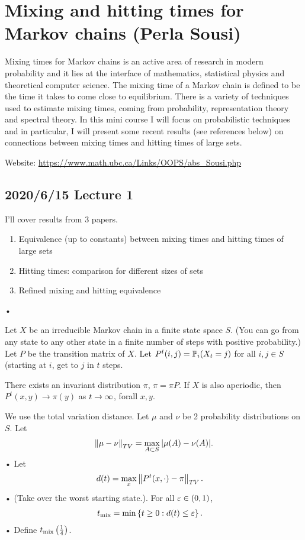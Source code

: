 \section{Mixing and hitting times for Markov chains (Perla Sousi)}

Mixing times for Markov chains is an active area of research in modern probability and it lies at the interface of mathematics, statistical physics and theoretical computer science. The mixing time of a Markov chain is defined to be the time it takes to come close to equilibrium. There is a variety of techniques used to estimate mixing times, coming from probability, representation theory and spectral theory. In this mini course I will focus on probabilistic techniques and in particular, I will present some recent results (see references below) on connections between mixing times and hitting times of large sets. 

Website: \url{https://www.math.ubc.ca/Links/OOPS/abs_Sousi.php}

\subsection*{2020/6/15 Lecture 1}

I'll cover results from 3 papers.
\begin{enumerate}
\item
Equivalence (up to constants) between mixing times and hitting times of large sets
\item
Hitting times: comparison for different sizes of sets
\item
Refined mixing and hitting equivalence
\end{enumerate}•

Let $X$ be an irreducible Markov chain in a finite state space $S$. (You can go from any state to any other state in a finite number of steps with positive probability.) Let $P$ be the transition matrix of $X$. 
Let $P^t(i,j)=\mathbb{P}_i(X_t=j)$ for all $i,j\in S$ (starting at $i$, get to $j$ in $t$ steps. 

There exists an invariant distribution $\pi$, $\pi=\pi P$. 
If $X$ is also aperiodic, then $P^t(x,y)\to \pi(y)$ as $t\to \infty$, forall $x,y$. 

We use the total variation distance. Let $\mu$ and $\nu$ be 2 probability distributions on $S$. Let 
\begin{align*}
\left\Vert {\mu - \nu}\right\Vert_{TV}=\max_{A\subset S}|\mu(A)-\nu(A)|.
\end{align*}•
Let
\begin{align*}
d(t) &= \max_x\left\Vert {P^t(x,\cdot)-\pi}\right\Vert_{TV}.
\end{align*}•
(Take over the worst starting state.). For all $\varepsilon\in (0,1)$, 
\begin{align*}
t_{\text{mix}} &= \min \left\{{t\ge 0}:{d(t)\le \varepsilon}\right\}.
\end{align*}•
Define $t_{\text{mix}}\left( {\frac{1}{4}} \right)$. 

